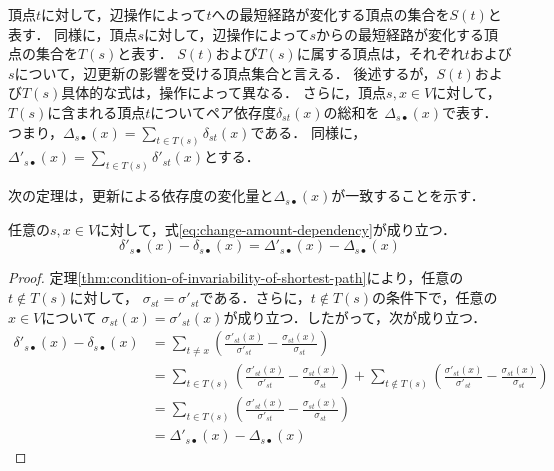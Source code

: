 頂点$t$に対して，辺操作によって$t$への最短経路が変化する頂点の集合を$S(t)$と表す．
同様に，頂点$s$に対して，辺操作によって$s$からの最短経路が変化する頂点の集合を$T(s)$と表す．
$S(t)$および$T(s)$に属する頂点は，それぞれ$t$および$s$について，辺更新の影響を受ける頂点集合と言える．
後述するが，$S(t)$および$T(s)$具体的な式は，操作によって異なる．
さらに，頂点$s,x\in V$に対して，$T(s)$に含まれる頂点$t$についてペア依存度$\delta_{st}(x)$の総和を
$\Delta_{s\bullet}(x)$で表す\cite{Bergamini2017}．
つまり，$\Delta_{s\bullet}(x)=\sum_{t\in T(s)}\delta_{st}(x)$である．
同様に，$\Delta'_{s\bullet}(x)=\sum_{t\in T(s)}\delta'_{st}(x)$とする．

次の定理は，更新による依存度の変化量と$\Delta_{s\bullet}(x)$が一致することを示す．
\begin{theorem}
  任意の$s,x\in V$に対して，式\eqref{eq:change-amount-dependency}が成り立つ．
  \begin{equation}
    \delta'_{s\bullet}(x)-\delta_{s\bullet}(x)=\Delta'_{s\bullet}(x)-\Delta_{s\bullet}(x)
    \label{eq:change-amount-dependency}
  \end{equation}
\end{theorem}
\begin{proof}
  定理\ref{thm:condition-of-invariability-of-shortest-path}により，任意の$t\notin T(s)$に対して，
  $\sigma_{st}=\sigma'_{st}$である．さらに，$t\notin T(s)$の条件下で，任意の$x\in V$について
  $\sigma_{st}(x)=\sigma'_{st}(x)$が成り立つ．したがって，次が成り立つ．
  \begin{equation*}
    \begin{aligned}
      \delta'_{s\bullet}(x)-\delta_{s\bullet}(x)
      &=\sum_{t\neq x}\left(\frac{\sigma'_{st}(x)}{\sigma'_{st}}-\frac{\sigma_{st}(x)}{\sigma_{st}}\right) \\
      &=\sum_{t\in T(s)}\left(\frac{\sigma'_{st}(x)}{\sigma'_{st}}-\frac{\sigma_{st}(x)}{\sigma_{st}}\right)
      +\sum_{t\notin T(s)}\left(\frac{\sigma'_{st}(x)}{\sigma'_{st}}-\frac{\sigma_{st}(x)}{\sigma_{st}}\right) \\
      &=\sum_{t\in T(s)}\left(\frac{\sigma'_{st}(x)}{\sigma'_{st}}-\frac{\sigma_{st}(x)}{\sigma_{st}}\right) \\
      &=\Delta'_{s\bullet}(x)-\Delta_{s\bullet}(x)
    \end{aligned}
  \end{equation*}
\end{proof}

